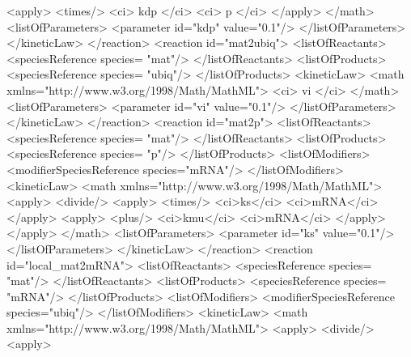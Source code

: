 \documentclass{cekarticle}
\begin{document}
\begin{example}
                    <apply>
                        <times/>
                        <ci> kdp </ci>
                        <ci> p </ci>
                    </apply>
                </math>
                <listOfParameters>
                    <parameter id="kdp" value="0.1"/>
                </listOfParameters>
            </kineticLaw>
        </reaction>
        <reaction id="mat2ubiq">
            <listOfReactants>
                <speciesReference species= "mat"/>
            </listOfReactants>
            <listOfProducts>
                <speciesReference species= "ubiq"/>
            </listOfProducts>
            <kineticLaw>
                <math xmlns="http://www.w3.org/1998/Math/MathML">
                    <ci> vi </ci>
                </math>
                <listOfParameters>
                    <parameter id="vi" value="0.1"/>
                </listOfParameters>
            </kineticLaw>
        </reaction>
        <reaction id="mat2p">
            <listOfReactants>
                <speciesReference species= "mat"/>
            </listOfReactants>
            <listOfProducts>
                <speciesReference species= "p"/>
            </listOfProducts>
            <listOfModifiers>
                <modifierSpeciesReference species="mRNA"/>
            </listOfModifiers>
            <kineticLaw>
                <math xmlns="http://www.w3.org/1998/Math/MathML">
                    <apply>
                        <divide/>
                        <apply>
                            <times/>
                            <ci>ks</ci>
                            <ci>mRNA</ci>    
                        </apply>
                        <apply>
                            <plus/>
                            <ci>kmu</ci>
                            <ci>mRNA</ci>
                        </apply>
                    </apply>
                </math>
                <listOfParameters>
                    <parameter id="ks" value="0.1"/>
                </listOfParameters>
            </kineticLaw>
        </reaction>
        <reaction id="local_mat2mRNA">
            <listOfReactants>
                <speciesReference species= "mat"/>
            </listOfReactants>
            <listOfProducts>
                <speciesReference species= "mRNA"/>
            </listOfProducts>
             <listOfModifiers>
                <modifierSpeciesReference species="ubiq"/>
            </listOfModifiers>
           <kineticLaw>
                <math xmlns="http://www.w3.org/1998/Math/MathML">
                    <apply>
                        <divide/>
                        <apply>

\end{example}
\end{document}
